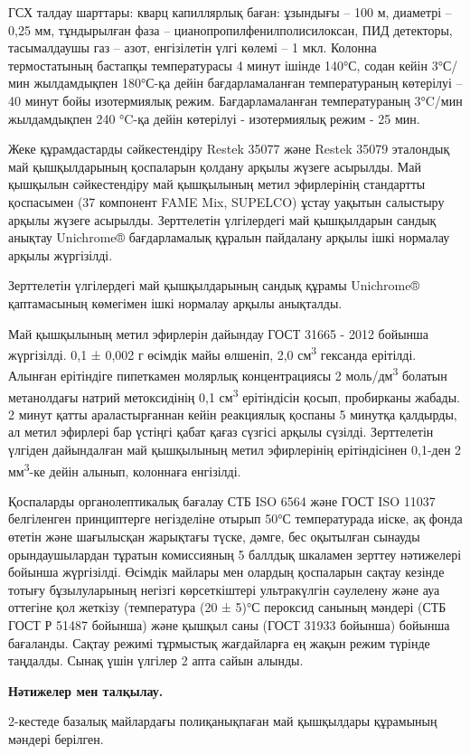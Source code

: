 \begin{multicols}{2}
ГСХ талдау шарттары: кварц капиллярлық баған: ұзындығы -- 100 м,
диаметрі -- 0,25 мм, тұндырылған фаза -- цианопропилфенилполисилоксан,
ПИД детекторы, тасымалдаушы газ -- азот, енгізілетін үлгі көлемі -- 1
мкл. Колонна термостатының бастапқы температурасы 4 минут ішінде 140°С,
содан кейін 3°С/мин жылдамдықпен 180°С-қа дейін бағдарламаланған
температураның көтерілуі -- 40 минут бойы изотермиялық режим.
Бағдарламаланған температураның 3°C/мин жылдамдықпен 240 °C-қа дейін
көтерілуі - изотермиялық режим - 25 мин.

Жеке құрамдастарды сәйкестендіру Restek 35077 және Restek 35079
эталондық май қышқылдарының қоспаларын қолдану арқылы жүзеге асырылды.
Май қышқылын сәйкестендіру май қышқылының метил эфирлерінің стандартты
қоспасымен (37 компонент FAME Mix, SUPELCO) ұстау уақытын салыстыру
арқылы жүзеге асырылды. Зерттелетін үлгілердегі май қышқылдарын сандық
анықтау Unichrome® бағдарламалық құралын пайдалану арқылы ішкі нормалау
арқылы жүргізілді.

Зерттелетін үлгілердегі май қышқылдарының сандық құрамы Unichrome®
қаптамасының көмегімен ішкі нормалау арқылы анықталды.

Май қышқылының метил эфирлерін дайындау ГОСТ 31665 - 2012 бойынша
жүргізілді. 0,1 ± 0,002 г өсімдік майы өлшеніп, 2,0
см\textsuperscript{3} гександа ерітілді. Алынған ерітіндіге пипеткамен
молярлық концентрациясы 2 моль/дм\textsuperscript{3} болатын метанолдағы
натрий метоксидінің 0,1 см\textsuperscript{3} ерітіндісін қосып,
пробирканы жабады. 2 минут қатты араластырғаннан кейін реакциялық
қоспаны 5 минутқа қалдырды, ал метил эфирлері бар үстіңгі қабат қағаз
сүзгісі арқылы сүзілді. Зерттелетін үлгіден дайындалған май қышқылының
метил эфирлерінің ерітіндісінен 0,1-ден 2 мм\textsuperscript{3}-ке дейін
алынып, колоннаға енгізілді.

Қоспаларды органолептикалық бағалау СТБ ISO 6564 және ГОСТ ISO 11037
белгіленген принциптерге негізделіне отырып 50°С температурада иіске, ақ
фонда өтетін және шағылысқан жарықтағы түске, дәмге, бес оқытылған
сынауды орындаушылардан тұратын комиссияның 5 баллдық шкаламен зерттеу
нәтижелері бойынша жүргізілді. Өсімдік майлары мен олардың қоспаларын
сақтау кезінде тотығу бұзылуларының негізгі көрсеткіштері ультракүлгін
сәулелену және ауа оттегіне қол жеткізу (температура (20 ± 5)°С пероксид
санының мәндері (СТБ ГОСТ Р 51487 бойынша) және қышқыл саны (ГОСТ 31933
бойынша) бойынша бағаланды. Сақтау режимі тұрмыстық жағдайларға ең жақын
режим түрінде таңдалды. Сынақ үшін үлгілер 2 апта сайын алынды.

{\bfseries Нәтижелер мен талқылау.}

2-кестеде базалық майлардағы полиқанықпаған май қышқылдары құрамының
мәндері берілген.
\end{multicols}

